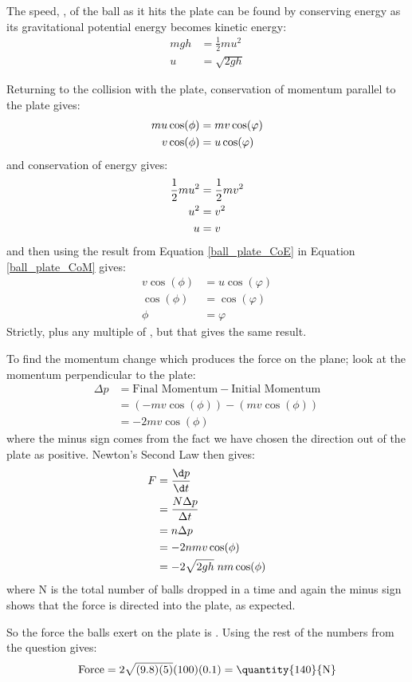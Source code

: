 \begin{problem}[HSC1946P1X1a]
{The speed, , of the ball as it hits the plate can be found by conserving energy as its gravitational potential energy becomes kinetic energy:
\begin{eqnarray*} 
mgh &= \frac{1}{2}mu^{2} \\ 
u &= \sqrt{2gh}
\end{eqnarray*}

Returning to the collision with the plate, conservation of momentum parallel to the plate gives:
\begin{eqnarray*}
 mu\cos(\phi) &= mv\cos(\varphi) \notag \\ 
 v\cos(\phi) &= u\cos(\varphi) \label{ball_plate_CoM} 
 \end{eqnarray*}
and conservation of energy gives:
\begin{eqnarray*}
 \frac{1}{2}mu^{2} &= \frac{1}{2}{m}v^{2} \notag \\ 
 u^{2} &= v^{2} \notag \\ 
 u &= v \label{ball_plate_CoE} 
\end{eqnarray*}
and then using the result from Equation \eqref{ball_plate_CoE} in Equation \eqref{ball_plate_CoM} gives:
\begin{eqnarray*} 
v\cos(\phi) &= u\cos(\varphi) \\ 
\cos(\phi) &= \cos(\varphi) \\ 
\phi &= \varphi
\end{eqnarray*}
Strictly,  plus any multiple of \quantity{2\pi}{}, but that gives the same result.

To find the momentum change which produces the force on the plane; look at the momentum perpendicular to the plate:
\begin{eqnarray*}
 \Delta p &= \text{Final Momentum} - \text{Initial Momentum} \\ 
 &= (-mv\cos(\phi)) - (mv\cos(\phi)) \\ 
 &= -2mv\cos(\phi) 
 \end{eqnarray*}
where the minus sign comes from the fact we have chosen the direction out of the plate as positive. Newton's Second Law then gives:
\begin{eqnarray*} 
F &= \frac{\d p}{\d t} \\ 
&= \frac{N \Delta p}{\Delta t} \\ 
&= n\Delta p \\ &= -2nmv\cos(\phi) \\ 
&= -2\sqrt{2gh}\;nm\cos(\phi) 
\end{eqnarray*}
where N is the total number of balls dropped in a time  and again the minus sign shows that the force is directed into the plate, as expected.

So the force the balls exert on the plate is . Using the rest of the numbers from the question gives:
\begin{equation*} 
\text{Force} = 2\sqrt{(9.8)(5)}(100)(0.1)= \mbox{\quantity{140}{N}} 
\end{equation*}
}
\end{problem}